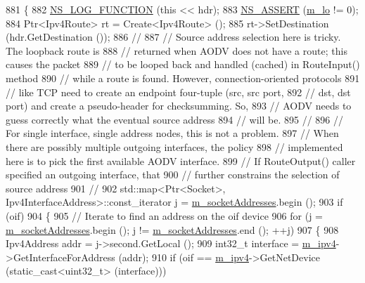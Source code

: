 \begin{DoxyCode}
881 \{
882   \hyperlink{log-macros-disabled_8h_a90b90d5bad1f39cb1b64923ea94c0761}{NS\_LOG\_FUNCTION} (\textcolor{keyword}{this} << hdr);
883   \hyperlink{assert_8h_a6dccdb0de9b252f60088ce281c49d052}{NS\_ASSERT} (\hyperlink{classns3_1_1aodv_1_1RoutingProtocol_a55d7e550c45e7a211ba8781f1b5b0015}{m\_lo} != 0);
884   Ptr<Ipv4Route> rt = Create<Ipv4Route> ();
885   rt->SetDestination (hdr.GetDestination ());
886   \textcolor{comment}{//}
887   \textcolor{comment}{// Source address selection here is tricky.  The loopback route is}
888   \textcolor{comment}{// returned when AODV does not have a route; this causes the packet}
889   \textcolor{comment}{// to be looped back and handled (cached) in RouteInput() method}
890   \textcolor{comment}{// while a route is found. However, connection-oriented protocols}
891   \textcolor{comment}{// like TCP need to create an endpoint four-tuple (src, src port,}
892   \textcolor{comment}{// dst, dst port) and create a pseudo-header for checksumming.  So,}
893   \textcolor{comment}{// AODV needs to guess correctly what the eventual source address}
894   \textcolor{comment}{// will be.}
895   \textcolor{comment}{//}
896   \textcolor{comment}{// For single interface, single address nodes, this is not a problem.}
897   \textcolor{comment}{// When there are possibly multiple outgoing interfaces, the policy}
898   \textcolor{comment}{// implemented here is to pick the first available AODV interface.}
899   \textcolor{comment}{// If RouteOutput() caller specified an outgoing interface, that }
900   \textcolor{comment}{// further constrains the selection of source address}
901   \textcolor{comment}{//}
902   std::map<Ptr<Socket>, Ipv4InterfaceAddress>::const\_iterator j = 
      \hyperlink{classns3_1_1aodv_1_1RoutingProtocol_aa3263563cbbd735faafbf17fd4e28a10}{m\_socketAddresses}.begin ();
903   \textcolor{keywordflow}{if} (oif)
904     \{
905       \textcolor{comment}{// Iterate to find an address on the oif device}
906       \textcolor{keywordflow}{for} (j = \hyperlink{classns3_1_1aodv_1_1RoutingProtocol_aa3263563cbbd735faafbf17fd4e28a10}{m\_socketAddresses}.begin (); j != 
      \hyperlink{classns3_1_1aodv_1_1RoutingProtocol_aa3263563cbbd735faafbf17fd4e28a10}{m\_socketAddresses}.end (); ++j)
907         \{
908           Ipv4Address addr = j->second.GetLocal ();
909           int32\_t \textcolor{keyword}{interface }= \hyperlink{classns3_1_1aodv_1_1RoutingProtocol_aee33006b1f9d8b24d4722037ff3fec98}{m\_ipv4}->GetInterfaceForAddress (addr);
910           \textcolor{keywordflow}{if} (oif == \hyperlink{classns3_1_1aodv_1_1RoutingProtocol_aee33006b1f9d8b24d4722037ff3fec98}{m\_ipv4}->GetNetDevice (static\_cast<uint32\_t> (interface)))

\end{DoxyCode}
